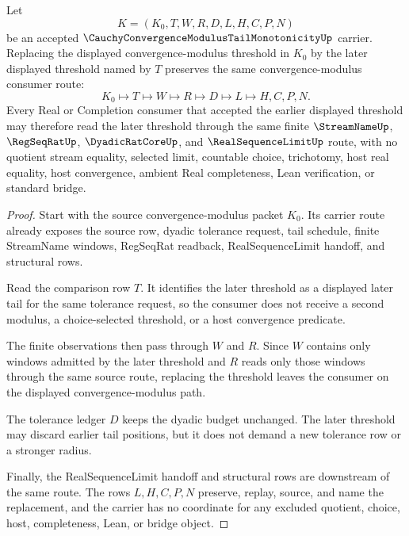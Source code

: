 \begin{theorem}
\label{thm:cauchy-convergence-modulus-tail-monotonicity-stability}
Let
$$
K=(K_0,T,W,R,D,L,H,C,P,N)
$$
be an accepted $\CauchyConvergenceModulusTailMonotonicityUp$ carrier. Replacing the displayed convergence-modulus threshold in $K_0$ by the later displayed threshold named by $T$ preserves the same convergence-modulus consumer route:
$$
K_0 \longmapsto T \longmapsto W \longmapsto R \longmapsto D \longmapsto L \longmapsto H,C,P,N .
$$
Every Real or Completion consumer that accepted the earlier displayed threshold may therefore read the later threshold through the same finite $\StreamNameUp$, $\RegSeqRatUp$, $\DyadicRatCoreUp$, and $\RealSequenceLimitUp$ route, with no quotient stream equality, selected limit, countable choice, trichotomy, host real equality, host convergence, ambient Real completeness, Lean verification, or standard bridge.
\end{theorem}
\begin{proof}
Start with the source convergence-modulus packet $K_0$. Its carrier route already exposes the source row, dyadic tolerance request, tail schedule, finite StreamName windows, RegSeqRat readback, RealSequenceLimit handoff, and structural rows.

Read the comparison row $T$. It identifies the later threshold as a displayed later tail for the same tolerance request, so the consumer does not receive a second modulus, a choice-selected threshold, or a host convergence predicate.

The finite observations then pass through $W$ and $R$. Since $W$ contains only windows admitted by the later threshold and $R$ reads only those windows through the same source route, replacing the threshold leaves the consumer on the displayed convergence-modulus path.

The tolerance ledger $D$ keeps the dyadic budget unchanged. The later threshold may discard earlier tail positions, but it does not demand a new tolerance row or a stronger radius.

Finally, the RealSequenceLimit handoff and structural rows are downstream of the same route. The rows $L,H,C,P,N$ preserve, replay, source, and name the replacement, and the carrier has no coordinate for any excluded quotient, choice, host, completeness, Lean, or bridge object.
\end{proof}


